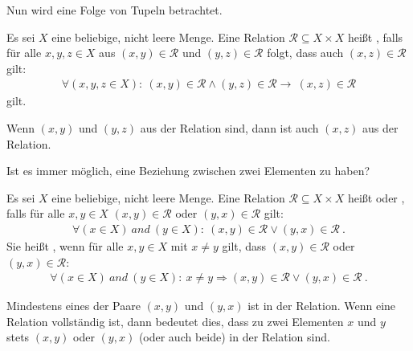 \begin{Unit}
Nun wird eine Folge von Tupeln betrachtet.
\begin{Definition}
  Es sei $X$ eine beliebige, nicht leere Menge. Eine Relation $\mathcal{R} 
  \subseteq X \times X$ heißt , falls für alle $x, y, z 
  \in X$ aus $(x, y) \in \mathcal{R}$ und $(y, z) \in \mathcal{R}$ folgt, 
  dass auch $(x, z) \in \mathcal{R}$ gilt:
  \begin{align}
    \forall (x, y, z \in X):\ (x, y) \in \mathcal{R} \land (y, z) \in
      \mathcal{R} \rightarrow\ (x, z) \in \mathcal{R}
  \end{align}
  gilt.
\end{Definition}
Wenn $(x,y)$ und $(y,z)$ aus der Relation sind, dann ist auch $(x,z)$ aus 
der Relation.
\end{Unit}

\begin{Unit}
Ist es immer möglich, eine Beziehung zwischen zwei Elementen zu haben?
\begin{Definition}
  Es sei $X$ eine beliebige, nicht leere Menge. Eine Relation $\mathcal{R} 
  \subseteq X \times X$ heißt  oder 
  , falls für alle $x, y \in X$ $(x, y) \in \mathcal{R}$ 
  oder $(y, x) \in \mathcal{R}$ gilt:
  \begin{align}
    \forall (x \in X)\ and\ (y \in X):\ (x, y) \in \mathcal{R} \lor (y, x)
      \in \mathcal{R} \ .
  \end{align}
  Sie heißt , wenn für alle $x, y \in X$ mit $x \not= y$ 
  gilt, dass $(x, y) \in \mathcal{R}$ oder $(y, x) \in \mathcal{R}$:
  \begin{align}
    \forall (x \in X)\ and\ (y \in X):\ x \not= y \Rightarrow (x, y) \in 
    \mathcal{R} \lor (y, x) \in \mathcal{R} \ .
  \end{align}
\end{Definition}
Mindestens eines der Paare $(x,y)$ und $(y,x)$ ist in der Relation. Wenn eine 
Relation vollständig ist, dann bedeutet dies, dass zu zwei Elementen $x$ und 
$y$ stets $(x,y)$ oder $(y,x)$ (oder auch beide) in der Relation sind.
\end{Unit}

